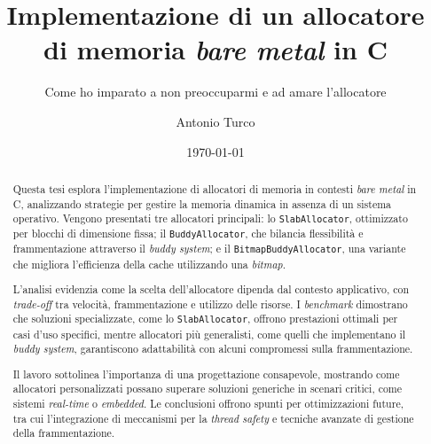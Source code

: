 \documentclass[noexaminfo,oneside]{sapthesis}
\title{Implementazione di un allocatore di memoria \textit{bare metal} in C}
\subtitle{Come ho imparato a non preoccuparmi e ad amare l'allocatore}
\author{Antonio Turco}
\date{\today}
\begin{document}
\frontmatter  
\maketitle
\dedication{A chi fa della curiosità il proprio mestiere}

\begin{abstract}
Questa tesi esplora l’implementazione di allocatori di memoria in contesti \textit{bare metal} in C, analizzando strategie per gestire la memoria dinamica in assenza di un sistema operativo. Vengono presentati tre allocatori principali: lo \texttt{SlabAllocator}, ottimizzato per blocchi di dimensione fissa; il \texttt{BuddyAllocator}, che bilancia flessibilità e frammentazione attraverso il \textit{buddy system}; e il \texttt{BitmapBuddyAllocator}, una variante che migliora l’efficienza della cache utilizzando una \textit{bitmap}.

L’analisi evidenzia come la scelta dell’allocatore dipenda dal contesto applicativo, con \textit{trade-off} tra velocità, frammentazione e utilizzo delle risorse. I \textit{benchmark} dimostrano che soluzioni specializzate, come lo \texttt{SlabAllocator}, offrono prestazioni ottimali per casi d’uso specifici, mentre allocatori più generalisti, come quelli che implementano il \textit{buddy system}, garantiscono adattabilità con alcuni compromessi sulla frammentazione.

Il lavoro sottolinea l’importanza di una progettazione consapevole, mostrando come allocatori personalizzati possano superare soluzioni generiche in scenari critici, come sistemi \textit{real-time} o \textit{embedded}. Le conclusioni offrono spunti per ottimizzazioni future, tra cui l’integrazione di meccanismi per la \textit{thread safety} e tecniche avanzate di gestione della frammentazione.
\end{abstract}


\mainmatter 
\tableofcontents













\backmatter
\end{document}
